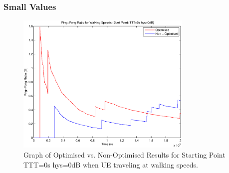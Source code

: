 \subsubsection*{Small Values}
\begin{figure}[H]
  \begin{center}
    	  \includegraphics[width=0.75\textwidth]{figures/walking_figures/low/long_ping.eps}
    \end{center}
    \caption{Graph of Optimised vs. Non-Optimised Results for Starting Point TTT=0s hys=0dB when UE traveling at walking speeds.}
    \label{fig:walk_low_drop}
\end{figure}

